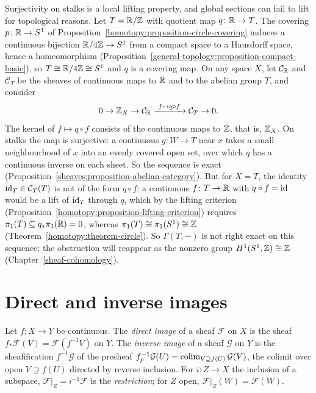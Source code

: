 \begin{counterexample}\label{sheaves:counterexample-lifting}
Surjectivity on stalks is a local lifting property, and global sections can fail to lift for topological reasons. Let $T = \mathbb{R}/\mathbb{Z}$ with quotient map $q \colon \mathbb{R} \to T$. The covering
$p \colon \mathbb{R} \to S^1$ of Proposition~\ref{homotopy:proposition-circle-covering} induces a continuous bijection $\mathbb{R}/4\mathbb{Z} \to S^1$ from a compact space to a Hausdorff space, hence a homeomorphism
(Proposition~\ref{general-topology:proposition-compact-basic}), so $T \cong \mathbb{R}/4\mathbb{Z} \cong S^1$ and $q$ is a covering map. On any space $X$, let $\mathcal{C}_{\mathbb{R}}$ and $\mathcal{C}_T$ be the sheaves of continuous maps
to $\mathbb{R}$ and to the abelian group $T$, and consider
\[
0 \to \mathbb{Z}_X \to \mathcal{C}_{\mathbb{R}} \xrightarrow{\ f \mapsto q \circ f\ } \mathcal{C}_T \to 0 .
\]
The kernel of $f \mapsto q \circ f$ consists of the continuous maps to $\mathbb{Z}$, that is, $\mathbb{Z}_X$. On stalks the map is surjective: a continuous $g \colon W \to T$ near $x$ takes a small neighbourhood of $x$ into an evenly covered
open set, over which $q$ has a continuous inverse on each sheet. So the sequence is exact (Proposition~\ref{sheaves:proposition-abelian-category}). But for $X = T$, the identity $\mathrm{id}_T \in \mathcal{C}_T(T)$ is not
of the form $q \circ f$: a continuous $f \colon T \to \mathbb{R}$ with $q \circ f = \mathrm{id}$ would be a lift of $\mathrm{id}_T$ through $q$, which by the lifting criterion (Proposition~\ref{homotopy:proposition-lifting-criterion})
requires $\pi_1(T) \subseteq q_*\pi_1(\mathbb{R}) = 0$, whereas $\pi_1(T) \cong \pi_1(S^1) \cong \mathbb{Z}$ (Theorem~\ref{homotopy:theorem-circle}). So $\Gamma(T, -)$ is not right exact on this sequence; the obstruction
will reappear as the nonzero group $H^1(S^1, \mathbb{Z}) \cong \mathbb{Z}$ (Chapter~\ref{sheaf-cohomology}).
\end{counterexample}

\section{Direct and inverse images}\label{sheaves:section-images}

\begin{definition}\label{sheaves:definition-images}
Let $f \colon X \to Y$ be continuous. The \emph{direct image} of a sheaf $\mathcal{F}$ on $X$ is the sheaf $f_*\mathcal{F}(V) = \mathcal{F}(f^{-1}V)$ on $Y$. The \emph{inverse image} of a sheaf
$\mathcal{G}$ on $Y$ is the sheafification $f^{-1}\mathcal{G}$ of the presheaf $f^{-1}_p\mathcal{G}(U) = \operatorname*{colim}_{V \supseteq f(U)}\mathcal{G}(V)$, the colimit over open $V \supseteq f(U)$
directed by reverse inclusion. For $i \colon Z \to X$ the inclusion of a subspace, $\mathcal{F}|_Z = i^{-1}\mathcal{F}$ is the \emph{restriction}; for $Z$ open,
$\mathcal{F}|_Z(W) = \mathcal{F}(W)$.
\end{definition}

